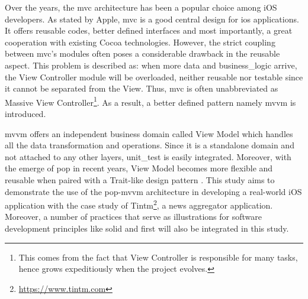 \documentclass[11pt,a4paper,oneside,article]{memoir}
\begin{document}
Over the years, the \gls{mvc} architecture has been a popular choice among \gls{iOS} developers. As stated by Apple, \gls{mvc} is a good central design for \gls{ios} applications. It offers reusable codes, better defined interfaces and most importantly, a great cooperation with existing Cocoa technologies. However, the strict coupling between \gls{mvc}'s modules often poses a considerable drawback in the reusable aspect.\cite{apple:mvc} This problem is described as: when more data and \gls{business_logic} arrive, the View Controller module will be overloaded, neither reusable nor testable since it cannot be separated from the View. Thus, \gls{mvc} is often unabbreviated as Massive View Controller\footnote{This comes from the fact that View Controller is responsible for many tasks, hence grows expeditiously when the project evolves.}. As a result, a better defined pattern namely \acrfull{mvvm} is introduced.

\gls{mvvm} offers an independent business domain called View Model which handles all the data transformation and operations. Since it is a standalone domain and not attached to any other layers, \gls{unit_test} is easily integrated. Moreover, with the emerge of \acrfull{pop} in recent years, View Model becomes more flexible and reusable when paired with a Trait-like design pattern \cite{machinethink:pattern}. This study aims to demonstrate the use of the \gls{pop-mvvm} architecture in developing a real-world \gls{iOS} application with the case study of Tintm\footnote{\url{https://www.tintm.com}}, a news aggregator application. Moreover, a number of practices that serve as illustrations for software development principles like \gls{solid} and \gls{first} will also be integrated in this study. 
    
\end{document}
